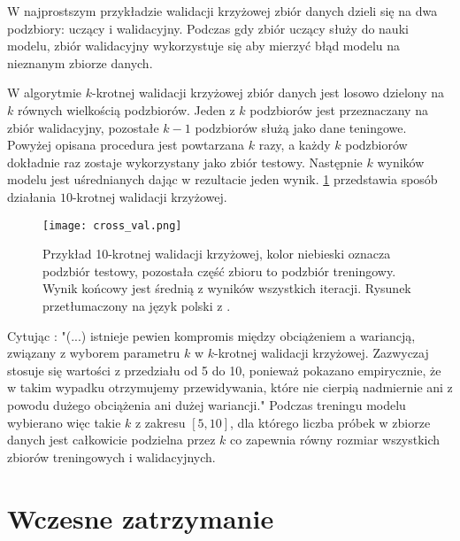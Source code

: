 \documentclass[11pt]{book}
\theoremstyle{definition}
\begin{document}
W najprostszym przykładzie walidacji krzyżowej zbiór danych dzieli się na dwa podzbiory: uczący i walidacyjny. Podczas gdy zbiór uczący służy do nauki modelu, zbiór walidacyjny wykorzystuje się aby mierzyć błąd modelu na nieznanym zbiorze danych. 

W algorytmie $k$-krotnej walidacji krzyżowej zbiór danych jest losowo dzielony na $k$ równych wielkością podzbiorów. Jeden z $k$ podzbiorów jest przeznaczany na zbiór walidacyjny, pozostałe $k-1$ podzbiorów służą jako dane teningowe. Powyżej opisana procedura jest powtarzana $k$ razy, a każdy $k$ podzbiorów dokładnie raz zostaje wykorzystany jako zbiór testowy. Następnie $k$ wyników modelu jest uśrednianych dając w rezultacie jeden wynik. \figurename{} \ref{fig:cross-val} przedstawia sposób działania $10$-krotnej walidacji krzyżowej.

\begin{figure}[htp!]
	\centering
	\texttt{[image: cross\_val.png]}
	\caption{Przykład 10-krotnej walidacji krzyżowej, kolor niebieski oznacza podzbiór testowy, pozostała część zbioru to podzbiór treningowy. Wynik końcowy jest średnią z wyników wszystkich iteracji. Rysunek przetłumaczony na język polski z \cite{Raschka:2015:PML:2886323}.}
	\label{fig:cross-val}
\end{figure}

Cytując \cite{James:2014:ISL:2517747}: "(...) istnieje pewien kompromis między obciążeniem a wariancją, związany z wyborem parametru $k$ w $k$-krotnej walidacji krzyżowej. Zazwyczaj stosuje się wartości z przedziału od 5 do 10, ponieważ pokazano empirycznie, że w takim wypadku otrzymujemy przewidywania, które nie cierpią nadmiernie ani z powodu dużego obciążenia ani dużej wariancji." Podczas treningu modelu wybierano więc takie $k$ z zakresu $[5,10]$, dla którego liczba próbek w zbiorze danych jest całkowicie podzielna przez $k$ co zapewnia równy rozmiar wszystkich zbiorów treningowych i walidacyjnych.

\section{Wczesne zatrzymanie}
 \label{wcz_zat}
 
\end{document}
